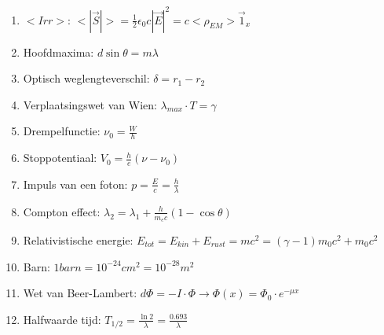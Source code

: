 \documentclass[12pt]{article}
\begin{document}
\begin{enumerate}
	    \item $<Irr>$: $ <|\vec{S}|> = \frac{1}{2} \epsilon_0 c |\vec{E}|^2 = c <\rho_{EM}> \vec{1}_x $
	    \item Hoofdmaxima: $ d \sin\theta = m\lambda $
	    \item Optisch weglengteverschil: $ \delta = r_1 - r_2 $
	    \item Verplaatsingswet van Wien: $ \lambda_{max} \cdot T = \gamma $
	    \item Drempelfunctie:  $ \nu_0 = \frac{W}{h} $
	    \item Stoppotentiaal: $ V_0 = \frac{h}{e} (\nu - \nu_0) $
	    \item Impuls van een foton: $ p = \frac{E}{c} = \frac{h}{\lambda} $
	    \item Compton effect: $ \lambda_2 = \lambda_1 + \frac{h}{m_e c} (1-\cos\theta) $
	    \item Relativistische energie: $ E_{tot} = E_{kin} + E_{rust} = mc^2 = (\gamma-1)m_0c^2 + m_0c^2 $
	    \item Barn: $ 1 barn = 10^{-24}cm^2 = 10^{-28}m^2 $
	    \item Wet van Beer-Lambert:  $ d\Phi = -I \cdot \Phi \to \Phi(x) = \Phi_0 \cdot e^{-\mu x} $
	    \item Halfwaarde tijd: $ T_{1/2} = \frac{\ln 2}{\lambda} = \frac{0.693}{\lambda} $
    \end{enumerate}
\end{document}
